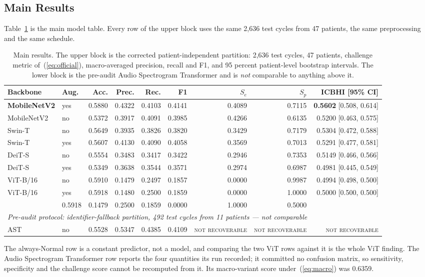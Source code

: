 \documentclass[journal,onecolumn]{IEEEtran}
\newcommand{\best}[1]{\textbf{#1}}
\newcommand{\notrec}{\textsc{not recoverable}}
\begin{document}
\subsection{Main Results}
\label{subsec:main}

Table~\ref{tab:main} is the main model table. Every row of the upper block uses the same
2,636 test cycles from 47 patients, the same preprocessing and the same schedule.

\begin{table}[!t]
\centering
\caption{Main results. The upper block is the corrected patient-independent partition: 2,636
test cycles, 47 patients, challenge metric of~(\ref{eq:official}), macro-averaged precision,
recall and F1, and 95 percent patient-level bootstrap intervals. The lower block is the
pre-audit Audio Spectrogram Transformer and is \emph{not} comparable to anything above it.}
\label{tab:main}
\footnotesize
\begin{tabular}{llrrrrrrr}
\toprule
Backbone & Aug. & Acc. & Prec. & Rec. & F1 & $S_e$ & $S_p$ & \best{ICBHI [95\% CI]} \\
\midrule
\best{MobileNetV2} & yes & 0.5880 & 0.4322 & 0.4103 & 0.4141 & 0.4089 & 0.7115 & \best{0.5602} [0.508, 0.614] \\
MobileNetV2 & no  & 0.5372 & 0.3917 & 0.4091 & 0.3985 & 0.4266 & 0.6135 & 0.5200 [0.463, 0.575] \\
Swin-T      & no  & 0.5649 & 0.3935 & 0.3826 & 0.3820 & 0.3429 & 0.7179 & 0.5304 [0.472, 0.588] \\
Swin-T      & yes & 0.5607 & 0.4130 & 0.4090 & 0.4058 & 0.3569 & 0.7013 & 0.5291 [0.477, 0.581] \\
DeiT-S      & no  & 0.5554 & 0.3483 & 0.3417 & 0.3422 & 0.2946 & 0.7353 & 0.5149 [0.466, 0.566] \\
DeiT-S      & yes & 0.5349 & 0.3638 & 0.3544 & 0.3571 & 0.2974 & 0.6987 & 0.4981 [0.445, 0.549] \\
ViT-B/16    & no  & 0.5910 & 0.1479 & 0.2497 & 0.1857 & 0.0000 & 0.9987 & 0.4994 [0.498, 0.500] \\
ViT-B/16    & yes & 0.5918 & 0.1480 & 0.2500 & 0.1859 & 0.0000 & 1.0000 & 0.5000 [0.500, 0.500] \\
\addlinespace
\multicolumn{2}{l}{\emph{Always-Normal baseline}} & 0.5918 & 0.1479 & 0.2500 & 0.1859 & 0.0000 & 1.0000 & 0.5000 \\
\midrule
\multicolumn{9}{l}{\emph{Pre-audit protocol: identifier-fallback partition, 492 test cycles from 11 patients --- not comparable}}\\
AST & no & 0.5528 & 0.5347 & 0.4385 & 0.4109 & \notrec & \notrec & \notrec \\
\bottomrule
\end{tabular}

\vspace{2pt}
\footnotesize The always-Normal row is a constant predictor, not a model, and comparing the two
ViT rows against it is the whole ViT finding. The Audio Spectrogram Transformer row reports the
four quantities its run recorded; it committed no confusion matrix, so sensitivity, specificity
and the challenge score cannot be recomputed from it. Its macro-variant score
under~(\ref{eq:macro}) was 0.6359.
\end{table}
\end{document}
